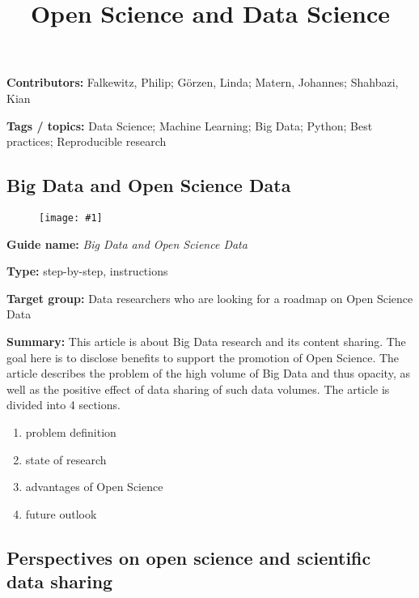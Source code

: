 \documentclass{article}
\newlength{\imgwidth}
\newcommand\scaledgraphics[2]{%
                
\settowidth{\imgwidth}{\texttt{[image: \#1]}}%
                
\setlength{\imgwidth}{\minof{\imgwidth}{#2\textwidth}}%
                
\texttt{[image: \#1]}%
                
}
\begin{document}
\title{Open Science and Data Science}

\maketitle


\textbf{Contributors:} Falkewitz, Philip;  Görzen, Linda; Matern, Johannes;  Shahbazi, Kian 


\textbf{Tags / topics:} Data Science; Machine Learning; Big Data; Python; Best practices; Reproducible research


\subsection{Big Data and Open Science Data}\label{H6205473}



\begin{center}
\begin{figure}
\scaledgraphics{25f071a6-9aec-4c08-bfd3-bfb548adfaee.jpg}{0.5}
\label{F77040021}
\end{figure}


\end{center}


 \textbf{Guide name:} \emph{Big Data and Open Science Data} \autocite{gutierrez_big_2015}


\textbf{Type:} step-by-step, instructions


\textbf{Target group:} Data researchers who are looking for a roadmap on Open Science Data


\textbf{Summary:} This article is about Big Data research and its content sharing. The goal here is to disclose benefits to support the promotion of Open Science. The article describes the problem of the high volume of Big Data and thus opacity, as well as the positive effect of data sharing of such data volumes. The article is divided into 4 sections.

\begin{enumerate}
\item problem definition


\item state of research


\item advantages of Open Science


\item future outlook


\end{enumerate}

\subsection{Perspectives on open science and scientific data sharing}\label{H5120034}
\end{document}

